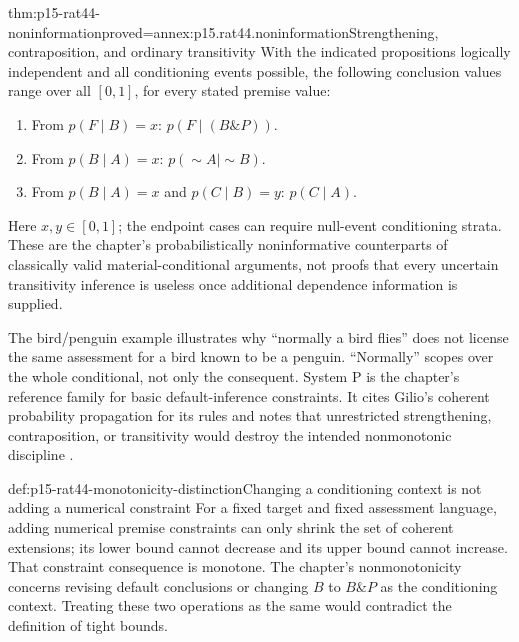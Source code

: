 \begin{hbtheorem}{thm:p15-rat44-noninformation}{proved=annex:p15.rat44.noninformation}{Strengthening, contraposition, and ordinary transitivity}
With the indicated propositions logically independent and all
conditioning events possible, the following conclusion values range
over all \([0,1]\), for every stated premise value:
\begin{enumerate}
\item From \(p(F\mid B)=x\): \(p(F\mid(B\mathbin{\&}P))\).
\item From \(p(B\mid A)=x\): \(p(\sim A\mid\sim B)\).
\item From \(p(B\mid A)=x\) and \(p(C\mid B)=y\): \(p(C\mid A)\).
\end{enumerate}
Here \(x,y\in[0,1]\); the endpoint cases can require null-event
conditioning strata. These are the chapter's probabilistically
noninformative counterparts of classically valid material-conditional
arguments, not proofs that every uncertain transitivity inference is
useless once additional dependence information is supplied.
\end{hbtheorem}

The bird/penguin example illustrates why ``normally a bird flies''
does not license the same assessment for a bird known to be a penguin.
``Normally'' scopes over the whole conditional, not only the consequent.
System P is the chapter's reference family for basic default-inference
constraints. It cites Gilio's coherent probability propagation for its
rules and notes that unrestricted strengthening, contraposition, or
transitivity would destroy the intended nonmonotonic discipline
\cite[pp.~280--281, note~5]{Pfeifer2021ProbabilityLogic}.

\begin{hbwarning}{def:p15-rat44-monotonicity-distinction}{Changing a conditioning context is not adding a numerical constraint}
For a fixed target and fixed assessment language, adding numerical
premise constraints can only shrink the set of coherent extensions;
its lower bound cannot decrease and its upper bound cannot increase.
That constraint consequence is monotone. The chapter's nonmonotonicity
concerns revising default conclusions or changing \(B\) to
\(B\mathbin{\&}P\) as the conditioning context. Treating these
two operations as the same would contradict the definition of tight
bounds.
\end{hbwarning}

